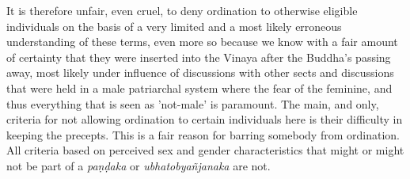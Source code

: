 It is therefore unfair, even cruel, to deny ordination to otherwise eligible individuals on the basis of a very limited and a most likely erroneous understanding of these terms, even more so because we know with a fair amount of certainty that they were inserted into the Vinaya after the Buddha's passing away, most likely under influence of discussions with other sects and discussions that were held in a male patriarchal system where the fear of the feminine, and thus everything that is seen as 'not-male' is paramount. The main, and only, criteria for not allowing ordination to certain individuals here is their difficulty in keeping the precepts. This is a fair reason for barring somebody from ordination. All criteria based on perceived sex and gender characteristics that might or might not be part of a {\em paṇḍaka} or {\em ubhatob­yañ­janaka} are not.

